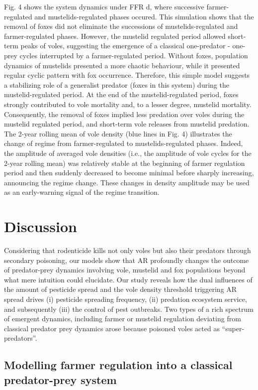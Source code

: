 \documentclass[11pt]{article}
\begin{document}
Fig. 4 shows the system dynamics under FFR d, where successive farmer-regulated and mustelids-regulated phases occured. This simulation shows that the removal of foxes did not eliminate the successions of mustelids-regulated and farmer-regulated phases. However, the mustelid regulated period allowed short-term peaks of voles, suggesting the emergence of a classical one-predator - one-prey cycles interrupted by a farmer-regulated period. Without foxes, population dynamics of mustelids presented a more chaotic behaviour, while it presented regular cyclic pattern with fox occurrence. Therefore, this simple model suggests a stabilizing role of a generalist predator (foxes in this system) during the mustelid-regulated period. At the end of the mustelid-regulated period, foxes strongly contributed to vole mortality and, to a lesser degree, mustelid mortality. Consequently, the removal of foxes implied less predation over voles during the mustelid regulated period, and short-term vole releases from mustelid predation. The 2-year rolling mean of vole density (blue lines in Fig. 4) illustrates the change of regime from farmer-regulated to mustelids-regulated phases. Indeed, the amplitude of averaged vole densities (i.e., the amplitude of vole cycles for the 2-year rolling mean) was relatively stable at the beginning of farmer regulation period and then suddenly decreased to become minimal before sharply increasing, announcing the regime change. These changes in density amplitude may be used as an early-warning signal of the regime transition. 

\section{Discussion} 
Considering that rodenticide kills not only voles but also their predators through secondary poisoning, our models show that AR profoundly changes the outcome of predator-prey dynamics involving vole, mustelid and fox populations beyond what mere intuition could elucidate. Our study reveals how the dual influences of the amount of pesticide spread and the vole density threshold triggering AR spread drives (i) pesticide spreading frequency, (ii) predation ecosystem service, and subsequently (iii) the control of pest outbreaks. Two types of a rich spectrum of emergent dynamics, including farmer or mustelid regulation deviating from classical predator prey dynamics arose because poisoned voles acted as “super-predators”. 

\subsection{Modelling farmer regulation into a classical predator-prey system}
 
\end{document}
